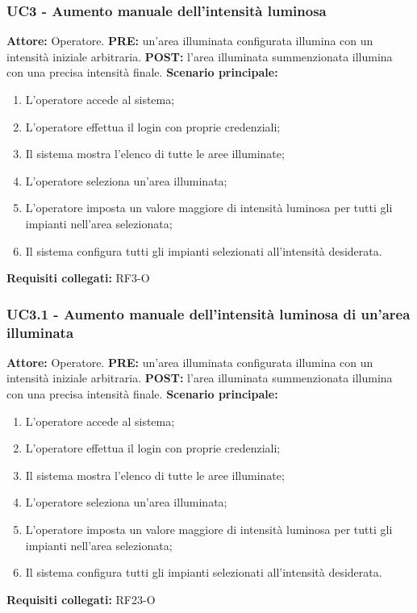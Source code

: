 \documentclass[a4paper, 12pt]{article}
\begin{document}
\subsubsection{UC3 - Aumento manuale dell'intensità luminosa}
\textbf{Attore:} Operatore.\newline
\textbf{PRE:} un'area illuminata configurata illumina con un intensità iniziale arbitraria.\newline
\textbf{POST:} l'area illuminata summenzionata illumina con una precisa intensità finale.\newline
\textbf{Scenario principale:}
\begin{enumerate}
    \item L'operatore accede al sistema;
    \item L'operatore effettua il login con proprie credenziali;
    \item Il sistema mostra l'elenco di tutte le aree illuminate;
    \item L'operatore seleziona un'area illuminata;
    \item L'operatore imposta un valore maggiore di intensità luminosa per tutti gli impianti nell'area selezionata;
    \item Il sistema configura tutti gli impianti selezionati all'intensità desiderata.
\end{enumerate}
\textbf{Requisiti collegati:} RF3-O\newline

\subsubsection{UC3.1 - Aumento manuale dell'intensità luminosa di un'area illuminata}
\textbf{Attore:} Operatore.\newline
\textbf{PRE:} un'area illuminata configurata illumina con un intensità iniziale arbitraria.\newline
\textbf{POST:} l'area illuminata summenzionata illumina con una precisa intensità finale.\newline
\textbf{Scenario principale:}
\begin{enumerate}
    \item L'operatore accede al sistema;
    \item L'operatore effettua il login con proprie credenziali;
    \item Il sistema mostra l'elenco di tutte le aree illuminate;
    \item L'operatore seleziona un'area illuminata;
    \item L'operatore imposta un valore maggiore di intensità luminosa per tutti gli impianti nell'area selezionata;
    \item Il sistema configura tutti gli impianti selezionati all'intensità desiderata.
\end{enumerate}
\textbf{Requisiti collegati:} RF23-O\newline
\end{document}
